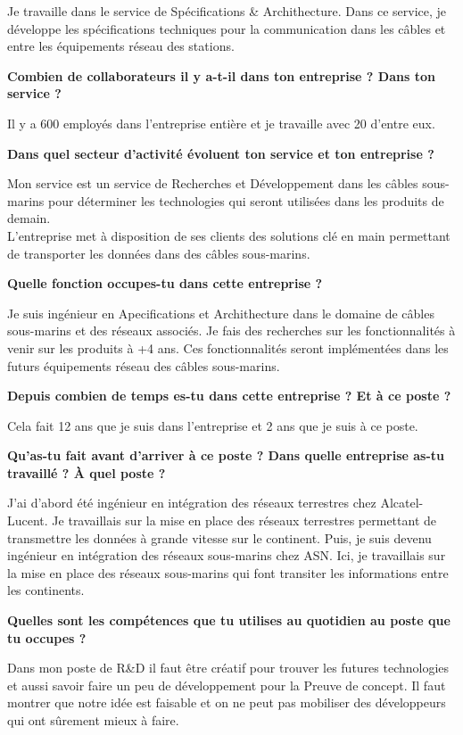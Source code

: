 \documentclass{article}
\newcommand{\question}[1]{\medskip\noindent\textbf{#1}\medskip}
\begin{document}
    Je travaille dans le service de Spécifications \& Archithecture.
    Dans ce service, je développe les spécifications techniques pour la communication dans les câbles et entre les équipements réseau des stations.

    \question{Combien de collaborateurs il y a-t-il dans ton entreprise ? Dans ton service ?}

    Il y a 600 employés dans l'entreprise entière et je travaille avec 20 d'entre eux.

    \question{Dans quel secteur d'activité évoluent ton service et ton entreprise ?}

    Mon service est un service de Recherches et Développement dans les câbles sous-marins pour déterminer les technologies qui seront utilisées dans les produits de demain.\\
    L'entreprise met à disposition de ses clients des solutions clé en main permettant de transporter les données dans des câbles sous-marins.

    \question{Quelle fonction occupes-tu dans cette entreprise ?}

    Je suis ingénieur en Apecifications et Archithecture dans le domaine de câbles sous-marins et des réseaux associés.
    Je fais des recherches sur les fonctionnalités à venir sur les produits à +4 ans.
    Ces fonctionnalités seront implémentées dans les futurs équipements réseau des câbles sous-marins.

    \question{Depuis combien de temps es-tu dans cette entreprise ? Et à ce poste ?}

    Cela fait 12 ans que je suis dans l'entreprise et 2 ans que je suis à ce poste.

    \question{Qu'as-tu fait avant d'arriver à ce poste ? Dans quelle entreprise as-tu travaillé ? À quel poste ?}

    J'ai d'abord été ingénieur en intégration des réseaux terrestres chez Alcatel-Lucent.
    Je travaillais sur la mise en place des réseaux terrestres permettant de transmettre les données à grande vitesse sur le continent.
    Puis, je suis devenu ingénieur en intégration des réseaux sous-marins chez ASN.
    Ici, je travaillais sur la mise en place des réseaux sous-marins qui font transiter les informations entre les continents.

    \question{Quelles sont les compétences que tu utilises au quotidien au poste que tu occupes ?}

    Dans mon poste de R\&D il faut être créatif pour trouver les futures technologies et aussi savoir faire un peu de développement pour la Preuve de concept.
    Il faut montrer que notre idée est faisable et on ne peut pas mobiliser des développeurs qui ont sûrement mieux à faire.
\end{document}
